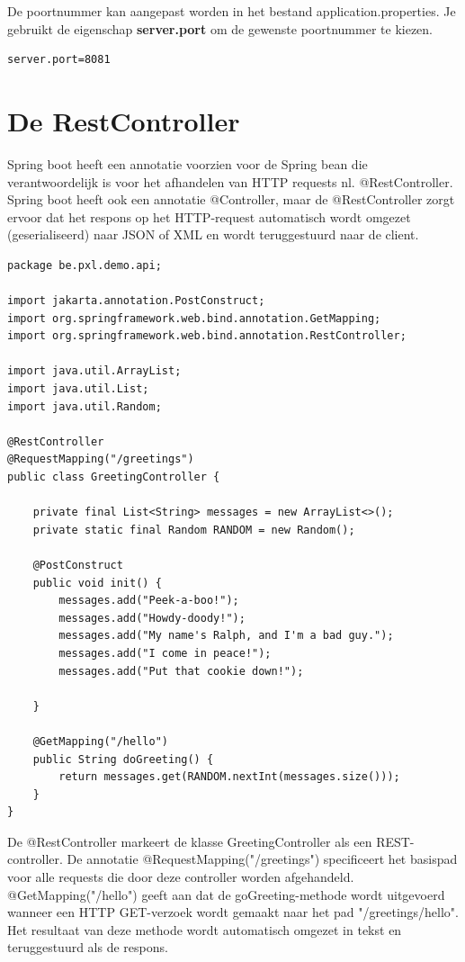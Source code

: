 De poortnummer kan aangepast worden in het bestand application.properties.  Je gebruikt de eigenschap \textbf{server.port} om de gewenste poortnummer te kiezen.

\begin{lstlisting}[frame=single]
server.port=8081
\end{lstlisting}

\section{De RestController}

Spring boot heeft een annotatie voorzien voor de Spring bean die verantwoordelijk is voor het afhandelen van HTTP requests nl. @RestController. Spring boot heeft ook een annotatie @Controller, maar de @RestController zorgt ervoor dat het respons op het HTTP-request automatisch wordt omgezet (geserialiseerd) naar JSON of XML en wordt teruggestuurd naar de client.


\begin{lstlisting}[frame=single]
package be.pxl.demo.api;

import jakarta.annotation.PostConstruct;
import org.springframework.web.bind.annotation.GetMapping;
import org.springframework.web.bind.annotation.RestController;

import java.util.ArrayList;
import java.util.List;
import java.util.Random;

@RestController
@RequestMapping("/greetings")
public class GreetingController {

    private final List<String> messages = new ArrayList<>();
    private static final Random RANDOM = new Random();

    @PostConstruct
    public void init() {
        messages.add("Peek-a-boo!");
        messages.add("Howdy-doody!");
        messages.add("My name's Ralph, and I'm a bad guy.");
        messages.add("I come in peace!");
        messages.add("Put that cookie down!");

    }

    @GetMapping("/hello")
    public String doGreeting() {
        return messages.get(RANDOM.nextInt(messages.size()));
    }
}
\end{lstlisting}

De @RestController markeert de klasse GreetingController als een REST-controller.
De annotatie @RequestMapping("/greetings") specificeert het basispad voor alle requests die door deze controller worden afgehandeld.
@GetMapping("/hello") geeft aan dat de goGreeting-methode wordt uitgevoerd wanneer een HTTP GET-verzoek wordt gemaakt naar het pad "/greetings/hello". Het resultaat van deze methode wordt automatisch omgezet in tekst en teruggestuurd als de respons.

